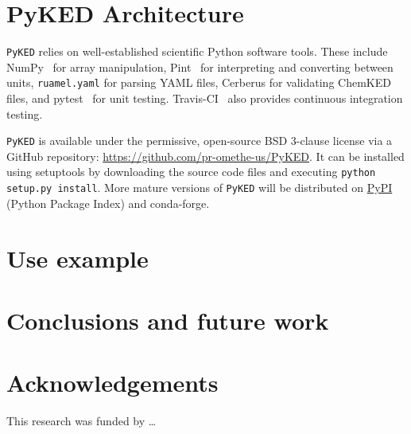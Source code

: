 \documentclass[12pt]{ussci}
\newcommand\ck{ChemKED}
\newcommand\pk{\texttt{PyKED}}
\begin{document}
\section{PyKED Architecture}
%

\pk{} relies on well-established scientific Python software tools.
These include NumPy~\cite{vanderWalt:2011np} for array manipulation, Pint~\cite{Grecco2016} for
interpreting and converting between units, \texttt{ruamel.yaml} for parsing YAML files,
Cerberus for validating \ck{} files,
and pytest~\cite{pytest:3.0.1} for unit testing.
Travis-CI~\cite{Travis2016} also provides continuous integration testing.


\pk{} is available under the permissive, open-source BSD 3-clause license via a GitHub
repository: \url{https://github.com/pr-omethe-us/PyKED}. It can be installed using setuptools
by downloading the source code files and executing \texttt{python setup.py install}. More mature
versions of \pk{} will be distributed on \href{https://pypi.python.org/pypi}{PyPI}
(Python Package Index) and conda-forge.

\section{Use example}
%


\section{Conclusions and future work}
%



\section{Acknowledgements}
This research was funded by \ldots
{}


\printbibliography
\end{document}
